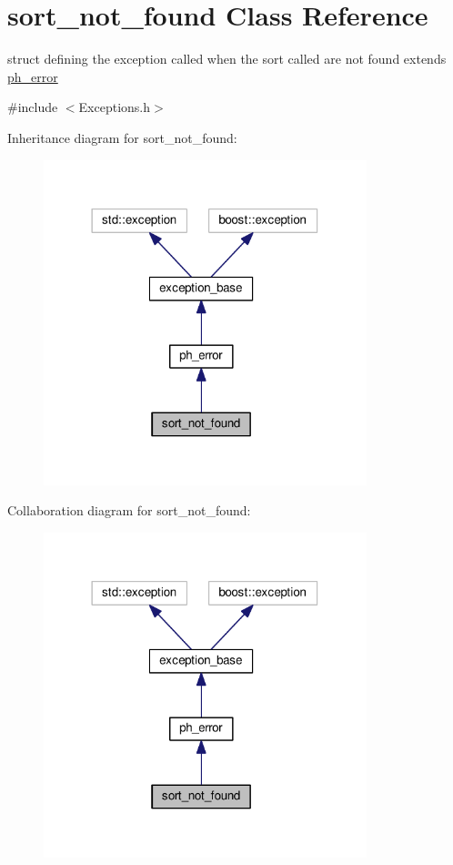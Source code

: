 \hypertarget{structsort__not__found}{\section{sort\+\_\+not\+\_\+found Class Reference}
\label{structsort__not__found}
}


struct defining the exception called when the sort called are not found extends \hyperlink{structph__error}{ph\+\_\+error}  




{\ttfamily \#include $<$Exceptions.\+h$>$}



Inheritance diagram for sort\+\_\+not\+\_\+found\+:\nopagebreak
\begin{figure}[H]
\begin{center}
\leavevmode
\includegraphics[width=266pt]{structsort__not__found__inherit__graph}
\end{center}
\end{figure}


Collaboration diagram for sort\+\_\+not\+\_\+found\+:\nopagebreak
\begin{figure}[H]
\begin{center}
\leavevmode
\includegraphics[width=266pt]{structsort__not__found__coll__graph}
\end{center}
\end{figure}


